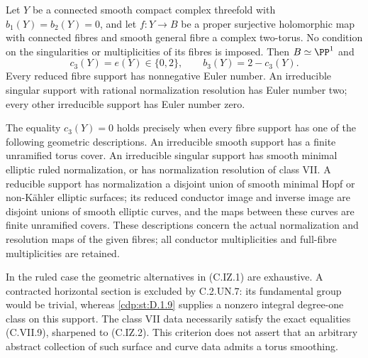 
\begin{proposition}\label{cdp:st:C.2.G.1}
Let $Y$ be a connected smooth compact complex threefold with
$b_1(Y)=b_2(Y)=0$, and let $f:Y\to B$ be a proper surjective
holomorphic map with connected fibres and smooth general fibre a
complex two-torus. No condition on the singularities or
multiplicities of its fibres is imposed. Then $B\simeq\PP^1$ and
\[
 c_3(Y)=e(Y)\in\{0,2\},\qquad b_3(Y)=2-c_3(Y).       \tag{C.G.1}\label{cdp:eq:C.G.1}
\]
Every reduced fibre support has nonnegative Euler number.
An irreducible singular support with rational normalization
resolution has Euler number two; every other irreducible support
has Euler number zero.

The equality $c_3(Y)=0$ holds precisely when every fibre support
has one of the following geometric descriptions. An irreducible
smooth support has a finite unramified torus cover. An irreducible
singular support has smooth minimal elliptic ruled normalization,
or has normalization resolution of class VII. A reducible support has
normalization a disjoint union of smooth minimal Hopf or
non-K\"ahler elliptic surfaces; its reduced conductor image and
inverse image are disjoint unions of smooth elliptic curves,
and the maps between these curves are finite unramified covers.
These descriptions concern the actual normalization and
resolution maps of the given fibres; all conductor multiplicities
and full-fibre multiplicities are retained.

In the ruled case the geometric alternatives in (C.IZ.1) are
exhaustive. A contracted horizontal section is excluded by
C.2.UN.7: its fundamental group would be trivial, whereas
\ref{cdp:st:D.1.9} supplies a nonzero integral degree-one class on this
support. The class VII data necessarily satisfy the exact
equalities (C.VII.9), sharpened to (C.IZ.2). This criterion
does not assert that an arbitrary abstract collection of such
surface and curve data admits a torus smoothing.
\end{proposition}
